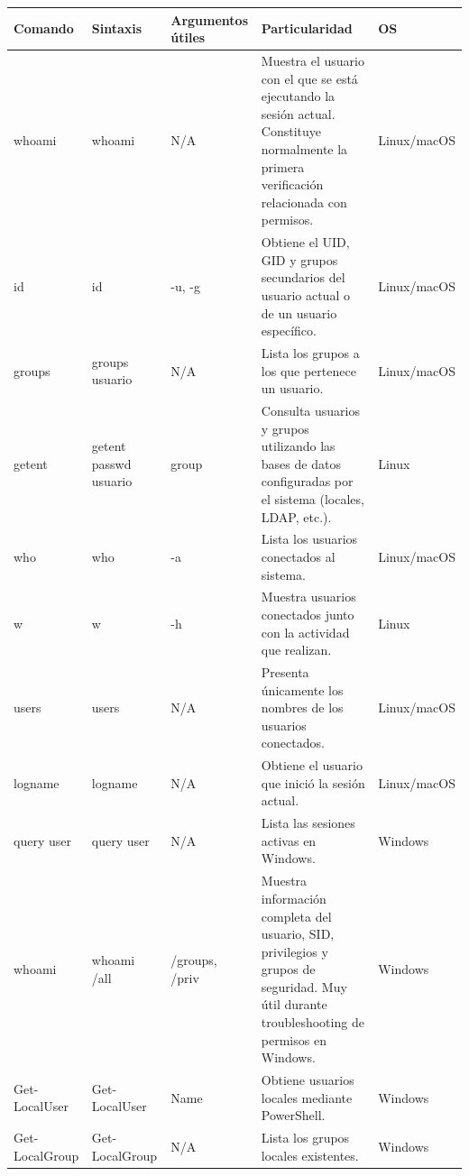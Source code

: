 \documentclass[a4paper,10pt]{article}
\begin{document}
\begin{longtable}{|p{2.8cm}|p{3.2cm}|p{4cm}|p{5.4cm}|p{1.5cm}|}

\hline
Comando &
Sintaxis &
Argumentos útiles &
Particularidad &
OS
\\
\hline
\endhead

whoami &
whoami &
N/A &
Muestra el usuario con el que se está ejecutando la sesión actual. Constituye normalmente la primera verificación relacionada con permisos. &
Linux/macOS
\\
\hline

id &
id &
-u, -g &
Obtiene el UID, GID y grupos secundarios del usuario actual o de un usuario específico. &
Linux/macOS
\\
\hline

groups &
groups usuario &
N/A &
Lista los grupos a los que pertenece un usuario. &
Linux/macOS
\\
\hline

getent &
getent passwd usuario &
group &
Consulta usuarios y grupos utilizando las bases de datos configuradas por el sistema (locales, LDAP, etc.). &
Linux
\\
\hline

who &
who &
-a &
Lista los usuarios conectados al sistema. &
Linux/macOS
\\
\hline

w &
w &
-h &
Muestra usuarios conectados junto con la actividad que realizan. &
Linux
\\
\hline

users &
users &
N/A &
Presenta únicamente los nombres de los usuarios conectados. &
Linux/macOS
\\
\hline

logname &
logname &
N/A &
Obtiene el usuario que inició la sesión actual. &
Linux/macOS
\\
\hline

query user &
query user &
N/A &
Lista las sesiones activas en Windows. &
Windows
\\
\hline

whoami &
whoami /all &
/groups, /priv &
Muestra información completa del usuario, SID, privilegios y grupos de seguridad. Muy útil durante troubleshooting de permisos en Windows. &
Windows
\\
\hline

Get-LocalUser &
Get-LocalUser &
Name &
Obtiene usuarios locales mediante PowerShell. &
Windows
\\
\hline

Get-LocalGroup &
Get-LocalGroup &
N/A &
Lista los grupos locales existentes. &
Windows
\\
\hline

\end{longtable}
\end{document}
